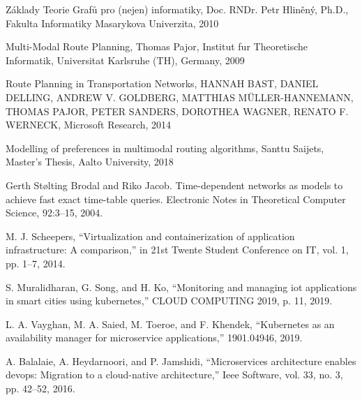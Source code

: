 \documentclass[thesis=M,czech]{FITthesis}[2019/12/23]
\theoremstyle{plain}
\theoremstyle{definition}
\begin{document}
\begin{thebibliography}{9}


Základy Teorie Grafů pro (nejen) informatiky, Doc. RNDr. Petr Hliněný, Ph.D., Fakulta Informatiky Masarykova Univerzita, 2010


Multi-Modal Route Planning, Thomas Pajor, Institut fur Theoretische Informatik, Universitat Karlsruhe (TH), Germany, 2009

Route Planning in Transportation Networks, HANNAH BAST, DANIEL DELLING, ANDREW V. GOLDBERG, MATTHIAS MÜLLER-HANNEMANN, THOMAS PAJOR, PETER SANDERS, DOROTHEA WAGNER, RENATO F. WERNECK, Microsoft Research, 2014


Modelling of preferences in multimodal routing algorithms, Santtu Saijets, Master’s Thesis, Aalto University, 2018


Gerth Stølting Brodal and Riko Jacob. Time-dependent networks as models to achieve fast exact time-table queries. Electronic Notes in Theoretical Computer Science, 92:3–15, 2004.



M. J. Scheepers, “Virtualization and containerization of application infrastructure: A comparison,” in 21st Twente Student Conference on IT, vol. 1,
pp. 1–7, 2014.


S. Muralidharan, G. Song, and H. Ko, “Monitoring and managing iot applications in smart cities using kubernetes,” CLOUD COMPUTING 2019,
p. 11, 2019.


L. A. Vayghan, M. A. Saied, M. Toeroe, and F. Khendek, “Kubernetes as an availability manager for microservice applications,” 1901.04946, 2019.


A. Balalaie, A. Heydarnoori, and P. Jamshidi, “Microservices architecture enables devops: Migration to a cloud-native architecture,” Ieee Software, vol. 33, no. 3, pp. 42–52, 2016.




\end{thebibliography}
\end{document}
